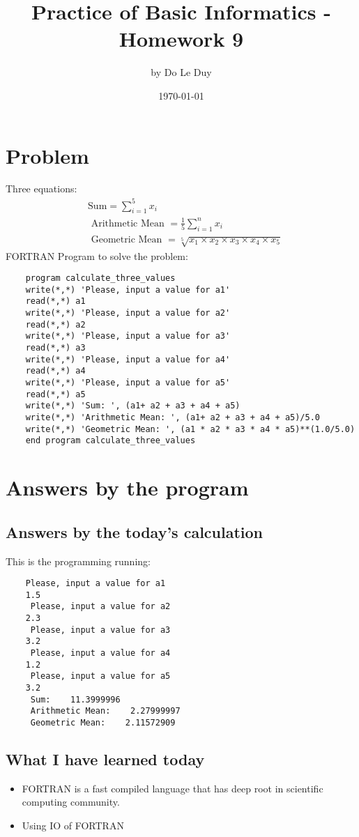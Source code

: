 \documentclass[11pt]{article}
\title{Practice of Basic Informatics - Homework 9}
\author{by Do Le Duy}
\date{\today}
\begin{document}
\maketitle
\section{Problem}
Three equations:
\begin{align*}
    &\text{Sum}=\sum_{i=1}^{5} x_{i} \\
    &\text { Arithmetic Mean }=\frac{1}{5} \sum_{i=1}^{n} x_{i} \\
    &\text { Geometric Mean }=\sqrt[5]{x_{1} \times x_{2} \times x_{3} \times x_{4} \times x_{5}}   
\end{align*}
FORTRAN Program to solve the problem:
\begin{verbatim} 
    program calculate_three_values
    write(*,*) 'Please, input a value for a1'
    read(*,*) a1 
    write(*,*) 'Please, input a value for a2'
    read(*,*) a2
    write(*,*) 'Please, input a value for a3'
    read(*,*) a3
    write(*,*) 'Please, input a value for a4'
    read(*,*) a4
    write(*,*) 'Please, input a value for a5'
    read(*,*) a5
    write(*,*) 'Sum: ', (a1+ a2 + a3 + a4 + a5)
    write(*,*) 'Arithmetic Mean: ', (a1+ a2 + a3 + a4 + a5)/5.0
    write(*,*) 'Geometric Mean: ', (a1 * a2 * a3 * a4 * a5)**(1.0/5.0)
    end program calculate_three_values
\end{verbatim} 

\section{Answers by the program}
\subsection{Answers by the today’s calculation}
This is the programming running:
\begin{verbatim}
    Please, input a value for a1
    1.5
     Please, input a value for a2
    2.3
     Please, input a value for a3
    3.2
     Please, input a value for a4
    1.2
     Please, input a value for a5
    3.2
     Sum:    11.3999996    
     Arithmetic Mean:    2.27999997    
     Geometric Mean:    2.11572909               
\end{verbatim}  
\subsection{What I have learned today}
\begin{itemize}
    \item FORTRAN is a fast compiled language that has deep root in scientific computing community.
    \item Using IO of FORTRAN
\end{itemize}
\end{document}
